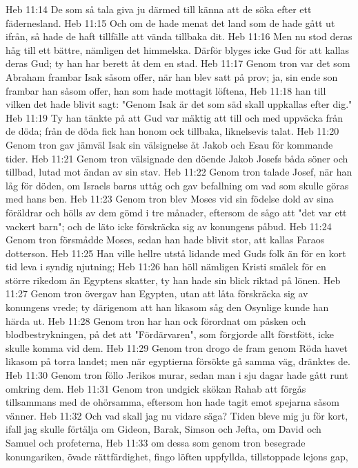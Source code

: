 Heb 11:14  De som så tala giva ju därmed till känna att de söka efter ett fädernesland.
Heb 11:15  Och om de hade menat det land som de hade gått ut ifrån, så hade de haft tillfälle att vända tillbaka dit.
Heb 11:16  Men nu stod deras håg till ett bättre, nämligen det himmelska. Därför blyges icke Gud för att kallas deras Gud; ty han har berett åt dem en stad.
Heb 11:17  Genom tron var det som Abraham frambar Isak såsom offer, när han blev satt på prov; ja, sin ende son frambar han såsom offer, han som hade mottagit löftena,
Heb 11:18  han till vilken det hade blivit sagt: "Genom Isak är det som säd skall uppkallas efter dig."
Heb 11:19  Ty han tänkte på att Gud var mäktig att till och med uppväcka från de döda; från de döda fick han honom ock tillbaka, liknelsevis talat.
Heb 11:20  Genom tron gav jämväl Isak sin välsignelse åt Jakob och Esau för kommande tider.
Heb 11:21  Genom tron välsignade den döende Jakob Josefs båda söner och tillbad, lutad mot ändan av sin stav.
Heb 11:22  Genom tron talade Josef, när han låg för döden, om Israels barns uttåg och gav befallning om vad som skulle göras med hans ben.
Heb 11:23  Genom tron blev Moses vid sin födelse dold av sina föräldrar och hölls av dem gömd i tre månader, eftersom de sågo att "det var ett vackert barn"; och de läto icke förskräcka sig av konungens påbud.
Heb 11:24  Genom tron försmådde Moses, sedan han hade blivit stor, att kallas Faraos dotterson.
Heb 11:25  Han ville hellre utstå lidande med Guds folk än för en kort tid leva i syndig njutning;
Heb 11:26  han höll nämligen Kristi smälek för en större rikedom än Egyptens skatter, ty han hade sin blick riktad på lönen.
Heb 11:27  Genom tron övergav han Egypten, utan att låta förskräcka sig av konungens vrede; ty därigenom att han likasom såg den Osynlige kunde han härda ut.
Heb 11:28  Genom tron har han ock förordnat om påsken och blodbestrykningen, på det att "Fördärvaren", som förgjorde allt förstfött, icke skulle komma vid dem.
Heb 11:29  Genom tron drogo de fram genom Röda havet likasom på torra landet; men när egyptierna försökte gå samma väg, dränktes de.
Heb 11:30  Genom tron föllo Jerikos murar, sedan man i sju dagar hade gått runt omkring dem.
Heb 11:31  Genom tron undgick skökan Rahab att förgås tillsammans med de ohörsamma, eftersom hon hade tagit emot spejarna såsom vänner.
Heb 11:32  Och vad skall jag nu vidare säga? Tiden bleve mig ju för kort, ifall jag skulle förtälja om Gideon, Barak, Simson och Jefta, om David och Samuel och profeterna,
Heb 11:33  om dessa som genom tron besegrade konungariken, övade rättfärdighet, fingo löften uppfyllda, tillstoppade lejons gap,
